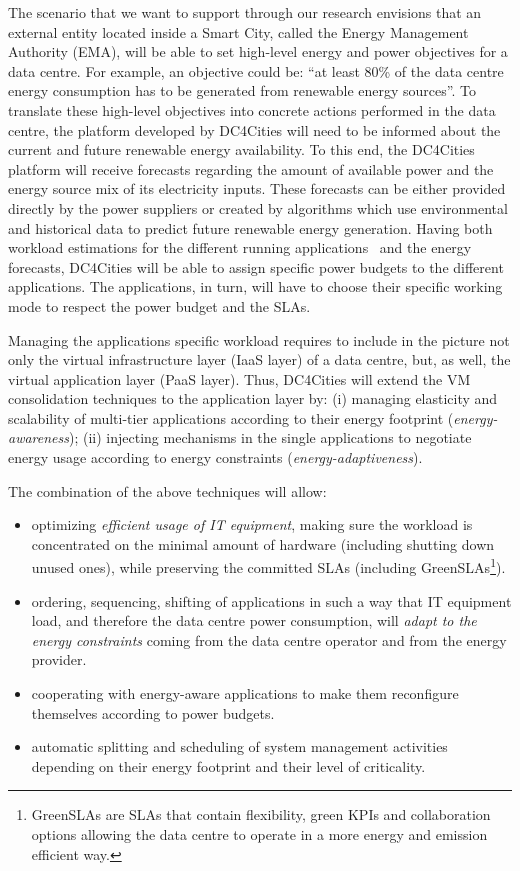 \documentclass[conference]{IEEEtran}
\begin{document}
The scenario that we want to support through our research envisions that an external entity located inside a Smart City, called the Energy Management Authority (EMA), will be able to set high-level energy and power objectives for a data centre.
For example, an objective could be: \enquote{at least 80\% of the data centre energy consumption has to be generated from renewable energy sources}.
To translate these high-level objectives into concrete actions performed in the data centre, the platform developed by DC4Cities will need to be informed about the current and future renewable energy availability.
To this end, the DC4Cities platform will receive forecasts regarding the amount of available power and the energy source mix of its electricity inputs.
These forecasts can be either provided directly by the power suppliers or created by algorithms which use environmental and historical data to predict future renewable energy generation.
Having both workload estimations for the different running applications~\cite{Kansal:2008:FEP:1453175.1453180} and the energy forecasts, DC4Cities will be able to assign specific power budgets to the different applications.
The applications, in turn, will have to choose their specific working mode to respect the power budget and the SLAs.

Managing the applications specific workload requires to include in the picture not only the virtual infrastructure layer (IaaS layer) of a data centre, but, as well, the virtual application layer (PaaS layer).
Thus, DC4Cities will extend the VM consolidation techniques to the application layer by: (i) managing elasticity and scalability of multi-tier applications according to their energy footprint (\emph{energy-awareness}); (ii) injecting mechanisms in the single applications to negotiate energy usage according to energy constraints (\emph{energy-adaptiveness}).

The combination of the above techniques will allow:
\begin{itemize}
  \item optimizing \emph{efficient usage of IT equipment}, making sure the workload is concentrated on the minimal amount of hardware (including shutting down unused ones), while preserving the committed SLAs (including GreenSLAs\footnote{GreenSLAs are SLAs that contain flexibility, green KPIs and collaboration options allowing the data centre to operate in a more energy and emission efficient way.}).
  \item ordering, sequencing, shifting of applications in such a way that IT equipment load, and therefore the data centre power consumption, will \emph{adapt to the energy constraints} coming from the data centre operator and from the energy provider.
  \item cooperating with energy-aware applications to make them reconfigure themselves according to power budgets.
  \item automatic splitting and scheduling of system management activities depending on their energy footprint and their level of criticality.
\end{itemize}
\end{document}
